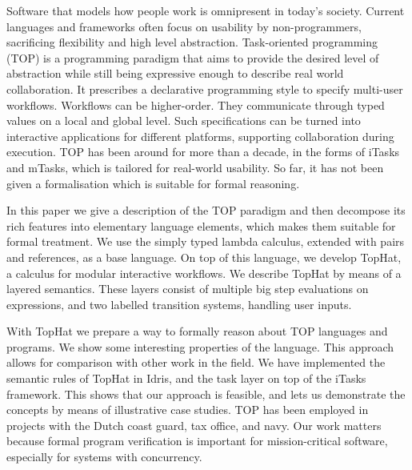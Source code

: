 
Software that models how people work is omnipresent in today's society.
Current languages and frameworks often focus on usability by non-programmers, sacrificing flexibility and high level abstraction.
Task-oriented programming (TOP) is a programming paradigm that aims to provide the desired level of abstraction while still being expressive enough to describe real world collaboration.
It prescribes a declarative programming style to specify multi-user workflows.
Workflows can be higher-order.
They communicate through typed values on a local and global level.
Such specifications can be turned into interactive applications for different platforms, supporting collaboration during execution.
TOP has been around for more than a decade, in the forms of iTasks and mTasks, which is tailored for real-world usability.
So far, it has not been given a formalisation which is suitable for formal reasoning.

In this paper we give a description of the TOP paradigm and then decompose its rich features into elementary language elements, which makes them suitable for formal treatment.
We use the simply typed lambda calculus, extended with pairs and references, as a base language.
On top of this language, we develop TopHat, a calculus for modular interactive workflows.
We describe TopHat by means of a layered semantics.
These layers consist of multiple big step evaluations on expressions, and two labelled transition systems, handling user inputs.

With TopHat we prepare a way to formally reason about TOP languages and programs.
We show some interesting properties of the language.
This approach allows for comparison with other work in the field.
We have implemented the semantic rules of TopHat in Idris, and the task layer on top of the iTasks framework.
This shows that our approach is feasible, and lets us demonstrate the concepts by means of illustrative case studies.
TOP has been employed in projects with the Dutch coast guard, tax office, and navy.
Our work matters because formal program verification is important for mission-critical software, especially for systems with concurrency.



